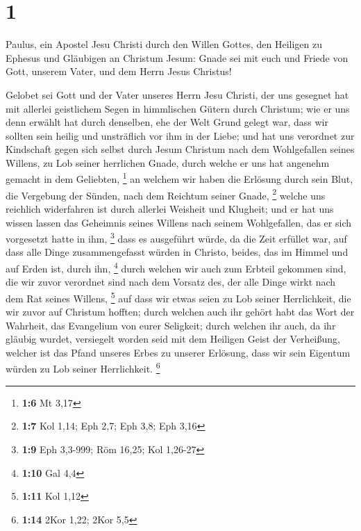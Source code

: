 \hypertarget{section}{%
\section{1}\label{section}}

 Paulus, ein Apostel Jesu Christi durch den Willen Gottes,
den Heiligen zu Ephesus und Gläubigen an Christum Jesum: 
Gnade sei mit euch und Friede von Gott, unserem Vater, und dem Herrn
Jesus Christus!

 Gelobet sei Gott und der Vater unseres Herrn Jesu
Christi, der uns gesegnet hat mit allerlei geistlichem Segen in
himmlischen Gütern durch Christum;  wie er uns denn
erwählt hat durch denselben, ehe der Welt Grund gelegt war, dass wir
sollten sein heilig und unsträflich vor ihm in der Liebe; 
und hat uns verordnet zur Kindschaft gegen sich selbst durch Jesum
Christum nach dem Wohlgefallen seines Willens,  zu Lob
seiner herrlichen Gnade, durch welche er uns hat angenehm gemacht in dem
Geliebten, \footnote{\textbf{1:6} Mt 3,17}  an welchem wir
haben die Erlösung durch sein Blut, die Vergebung der Sünden, nach dem
Reichtum seiner Gnade, \footnote{\textbf{1:7} Kol 1,14; Eph 2,7; Eph
  3,8; Eph 3,16}  welche uns reichlich widerfahren ist
durch allerlei Weisheit und Klugheit;  und er hat uns
wissen lassen das Geheimnis seines Willens nach seinem Wohlgefallen, das
er sich vorgesetzt hatte in ihm, \footnote{\textbf{1:9} Eph 3,3-999; Röm
  16,25; Kol 1,26-27}  dass es ausgeführt würde, da die
Zeit erfüllet war, auf dass alle Dinge zusammengefasst würden in
Christo, beides, das im Himmel und auf Erden ist, durch ihn, \footnote{\textbf{1:10}
  Gal 4,4}  durch welchen wir auch zum Erbteil gekommen
sind, die wir zuvor verordnet sind nach dem Vorsatz des, der alle Dinge
wirkt nach dem Rat seines Willens, \footnote{\textbf{1:11} Kol 1,12}
 auf dass wir etwas seien zu Lob seiner Herrlichkeit, die
wir zuvor auf Christum hofften;  durch welchen auch ihr
gehört habt das Wort der Wahrheit, das Evangelium von eurer Seligkeit;
durch welchen ihr auch, da ihr gläubig wurdet, versiegelt worden seid
mit dem Heiligen Geist der Verheißung,  welcher ist das
Pfand unseres Erbes zu unserer Erlösung, dass wir sein Eigentum würden
zu Lob seiner Herrlichkeit. \footnote{\textbf{1:14} 2Kor 1,22; 2Kor 5,5}

